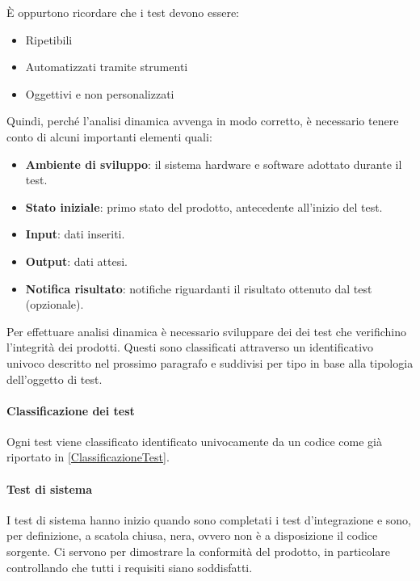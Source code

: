 	    È oppurtono ricordare che i test devono essere:
	    \begin{itemize}
	    	\item Ripetibili
	    	\item Automatizzati tramite strumenti
	    	\item Oggettivi e non personalizzati
	    \end{itemize}
	    
	    Quindi, perché l'analisi dinamica avvenga in modo corretto, è necessario tenere conto di alcuni importanti elementi quali:
	    \begin{itemize}
	    	\item \textbf{Ambiente di sviluppo}: il sistema hardware e software adottato durante il test.
	    	\item \textbf{Stato iniziale}: primo stato del prodotto, antecedente all'inizio del test.
	    	\item \textbf{Input}: dati inseriti.
	    	\item \textbf{Output}: dati attesi.
	    	\item \textbf{Notifica risultato}: notifiche riguardanti il risultato ottenuto dal test (opzionale).
	    \end{itemize}
	    
	    Per effettuare analisi dinamica è necessario sviluppare dei dei test che verifichino l'integrità dei prodotti. Questi sono classificati attraverso un identificativo univoco descritto nel prossimo paragrafo e suddivisi per tipo in base alla tipologia dell'oggetto di test.
	    
	    \paragraph{Classificazione dei test}\label{Validazione:ClassificazioneTest}
	    Ogni test viene classificato identificato univocamente da un codice come già riportato in \ref{ClassificazioneTest}.
	    
    
    \paragraph{Test di sistema} \label{testsistema}
    I test di sistema hanno inizio quando sono completati i test d'integrazione e sono, per definizione, a scatola chiusa, nera, ovvero non è a disposizione il codice sorgente.
    Ci servono per dimostrare la conformità del prodotto, in particolare controllando che tutti i requisiti siano soddisfatti.
    
